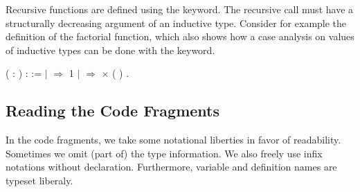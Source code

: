 Recursive functions are defined using the 
keyword. The recursive call must have a structurally decreasing
argument of an inductive type. Consider for example the definition of
the factorial function, which also shows how a case analysis on values
of inductive types can be done with the  keyword.
\begin{singlespace}
\begin{coqdoccode}
\coqdocnoindent
{}
( :
)
:
:=\coqdoceol
\coqdocindent{1.00em}
  \coqdoceol
\coqdocindent{1.00em}
\ensuremath{|}
\ensuremath{\Rightarrow} 1\coqdoceol
\coqdocindent{1.00em}
\ensuremath{|}
 \ensuremath{\Rightarrow}
 \ensuremath{\times}
(
)\coqdoceol
\coqdocindent{1.00em}
.\coqdoceol
\end{coqdoccode}
\end{singlespace}


\subsection{Reading the Code Fragments}

In the \Coq code fragments, we take some notational liberties in favor
of readability. Sometimes we omit (part of) the type information. We
also freely use infix notations without declaration. Furthermore,
variable and definition names are typeset liberaly.

